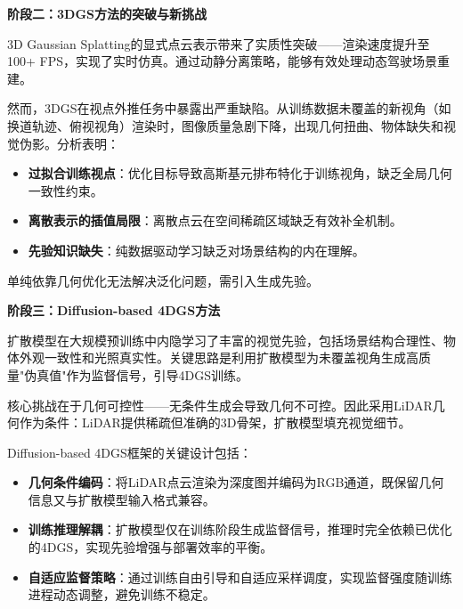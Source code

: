 \textbf{阶段二：3DGS方法的突破与新挑战}

3D Gaussian Splatting的显式点云表示带来了实质性突破——渲染速度提升至100+ FPS，实现了实时仿真。通过动静分离策略，能够有效处理动态驾驶场景重建。

然而，3DGS在视点外推任务中暴露出严重缺陷。从训练数据未覆盖的新视角（如换道轨迹、俯视视角）渲染时，图像质量急剧下降，出现几何扭曲、物体缺失和视觉伪影。分析表明：

\begin{itemize}
\item \textbf{过拟合训练视点}：优化目标导致高斯基元排布特化于训练视角，缺乏全局几何一致性约束。
\item \textbf{离散表示的插值局限}：离散点云在空间稀疏区域缺乏有效补全机制。
\item \textbf{先验知识缺失}：纯数据驱动学习缺乏对场景结构的内在理解。
\end{itemize}

单纯依靠几何优化无法解决泛化问题，需引入生成先验。

\textbf{阶段三：Diffusion-based 4DGS方法}

扩散模型在大规模预训练中内隐学习了丰富的视觉先验，包括场景结构合理性、物体外观一致性和光照真实性。关键思路是利用扩散模型为未覆盖视角生成高质量"伪真值"作为监督信号，引导4DGS训练。

核心挑战在于几何可控性——无条件生成会导致几何不可控。因此采用LiDAR几何作为条件：LiDAR提供稀疏但准确的3D骨架，扩散模型填充视觉细节。

Diffusion-based 4DGS框架的关键设计包括：

\begin{itemize}
\item \textbf{几何条件编码}：将LiDAR点云渲染为深度图并编码为RGB通道，既保留几何信息又与扩散模型输入格式兼容。
\item \textbf{训练推理解耦}：扩散模型仅在训练阶段生成监督信号，推理时完全依赖已优化的4DGS，实现先验增强与部署效率的平衡。
\item \textbf{自适应监督策略}：通过训练自由引导和自适应采样调度，实现监督强度随训练进程动态调整，避免训练不稳定。
\end{itemize}

